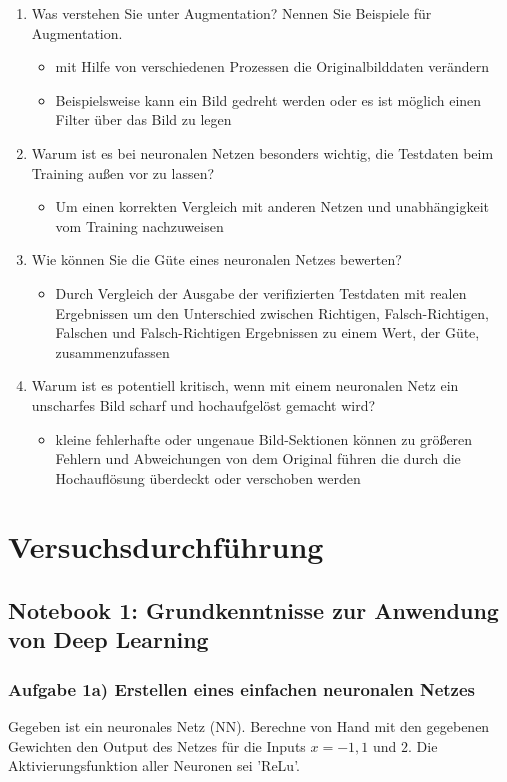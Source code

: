 \documentclass[a4paper,10pt,titlepage]{scrartcl}
\begin{document}
\begin{enumerate}
    \item Was verstehen Sie unter Augmentation? Nennen Sie Beispiele für Augmentation.
          \begin{itemize}
              \item mit Hilfe von verschiedenen Prozessen die Originalbilddaten verändern
              \item Beispielsweise kann ein Bild gedreht werden oder es ist möglich einen Filter über das Bild zu legen
          \end{itemize}
    \item Warum ist es bei neuronalen Netzen besonders wichtig, die Testdaten beim Training außen vor zu lassen?
          \begin{itemize}
              \item Um einen korrekten Vergleich mit anderen Netzen und unabhängigkeit vom Training nachzuweisen
          \end{itemize}
    \item Wie können Sie die Güte eines neuronalen Netzes bewerten?
          \begin{itemize}
              \item Durch Vergleich der Ausgabe der verifizierten Testdaten mit realen Ergebnissen um den Unterschied zwischen Richtigen, Falsch-Richtigen, Falschen und Falsch-Richtigen Ergebnissen zu einem Wert, der Güte, zusammenzufassen
          \end{itemize}
    \item Warum ist es potentiell kritisch, wenn mit einem neuronalen Netz ein unscharfes Bild scharf und hochaufgelöst gemacht wird?
          \begin{itemize}
              \item kleine fehlerhafte oder ungenaue Bild-Sektionen können zu größeren Fehlern und Abweichungen von dem Original führen die durch die Hochauflösung überdeckt oder verschoben werden
          \end{itemize}
\end{enumerate}
\newpage

\section{Versuchsdurchführung}
\subsection{Notebook 1: Grundkenntnisse zur Anwendung von Deep Learning}
\subsubsection{Aufgabe 1a) Erstellen eines einfachen neuronalen Netzes}
Gegeben ist ein neuronales Netz (NN). Berechne von Hand mit den gegebenen Gewichten den Output des Netzes für die Inputs $x = -1, 1$ und $2$. Die Aktivierungsfunktion aller Neuronen sei 'ReLu'.
\end{document}
